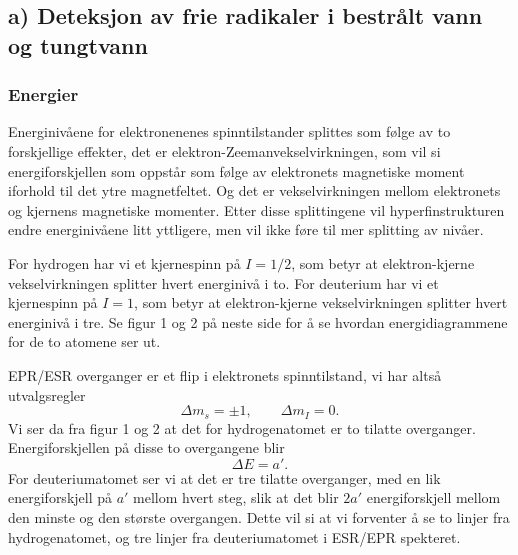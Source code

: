 \documentclass[a4paper, 11pt, notitlepage]{article}
\begin{document}
\subsection{a) Deteksjon av frie radikaler i bestrålt vann og tungtvann}

\subsubsection{Energier}
Energinivåene for elektronenenes spinntilstander splittes som følge av to forskjellige effekter, det er elektron-Zeemanvekselvirkningen, som vil si energiforskjellen som oppstår som følge av elektronets magnetiske moment iforhold til det ytre magnetfeltet. Og det er vekselvirkningen mellom elektronets og kjernens magnetiske momenter. Etter disse splittingene vil hyperfinstrukturen endre energinivåene litt yttligere, men vil ikke føre til mer splitting av nivåer.

For hydrogen har vi et kjernespinn på $I=1/2$, som betyr at elektron-kjerne vekselvirkningen splitter hvert energinivå i to. For deuterium har vi et kjernespinn på $I=1$, som betyr at elektron-kjerne vekselvirkningen splitter hvert energinivå i tre. Se figur 1 og 2 på neste side for å se hvordan energidiagrammene for de to atomene ser ut.

EPR/ESR overganger er et flip i elektronets spinntilstand, vi har altså utvalgsregler
$$\Delta m_s = \pm 1, \qquad \Delta m_I = 0.$$
Vi ser da fra figur 1 og 2 at det for hydrogenatomet er to tilatte overganger. Energiforskjellen på disse to overgangene blir
$$\Delta E = a'.$$
For deuteriumatomet ser vi at det er tre tilatte overganger, med en lik energiforskjell på $a'$ mellom hvert steg, slik at det blir $2a'$ energiforskjell mellom den minste og den største overgangen. Dette vil si at vi forventer å se to linjer fra hydrogenatomet, og tre linjer fra deuteriumatomet i ESR/EPR spekteret.
\end{document}
